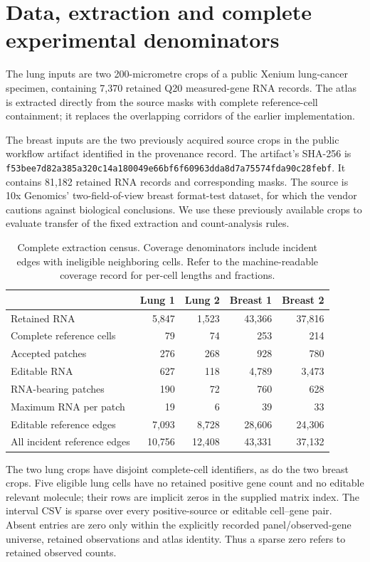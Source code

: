 \documentclass[10pt,letterpaper]{article}
\begin{document}

\FloatBarrier
\section{Data, extraction and complete experimental denominators}
The lung inputs are two 200-micrometre crops of a public Xenium lung-cancer specimen, containing 7,370 retained Q20 measured-gene RNA records. The atlas is extracted directly from the source masks with complete reference-cell containment; it replaces the overlapping corridors of the earlier implementation.

The breast inputs are the two previously acquired source crops in the public workflow artifact identified in the provenance record. The artifact's SHA-256 is \nolinkurl{f53bee7d82a385a320c14a180049e66bf6f60963dda8d7a75574fda90c28febf}. It contains 81,182 retained RNA records and corresponding masks. The source is 10x Genomics' two-field-of-view breast format-test dataset, for which the vendor cautions against biological conclusions. We use these previously available crops to evaluate transfer of the fixed extraction and count-analysis rules.

\begin{table}[ht]\centering
\begin{tabular}{lrrrr}\toprule
 &Lung 1&Lung 2&Breast 1&Breast 2\\\midrule
Retained RNA&5,847&1,523&43,366&37,816\\
Complete reference cells&79&74&253&214\\
Accepted patches&276&268&928&780\\
Editable RNA&627&118&4,789&3,473\\
RNA-bearing patches&190&72&760&628\\
Maximum RNA per patch&19&6&39&33\\
Editable reference edges&7,093&8,728&28,606&24,306\\
All incident reference edges&10,756&12,408&43,331&37,132\\\bottomrule
\end{tabular}
\caption{Complete extraction census. Coverage denominators include incident edges with ineligible neighboring cells. Refer to the machine-readable coverage record for per-cell lengths and fractions.}
\end{table}

The two lung crops have disjoint complete-cell identifiers, as do the two breast crops. Five eligible lung cells have no retained positive gene count and no editable relevant molecule; their rows are implicit zeros in the supplied matrix index. The interval CSV is sparse over every positive-source or editable cell--gene pair. Absent entries are zero only within the explicitly recorded panel/observed-gene universe, retained observations and atlas identity. Thus a sparse zero refers to retained observed counts.
\end{document}
